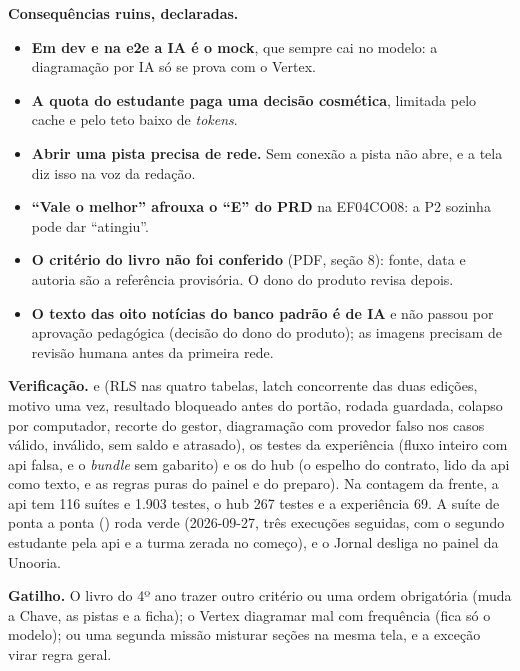 \textbf{Consequências ruins, declaradas.}

\begin{itemize}
  \item \textbf{Em dev e na e2e a IA é o mock}, que sempre cai no modelo: a
    diagramação por IA só se prova com o Vertex.
  \item \textbf{A quota do estudante paga uma decisão cosmética}, limitada pelo
    cache e pelo teto baixo de \emph{tokens}.
  \item \textbf{Abrir uma pista precisa de rede.} Sem conexão a pista não abre, e a
    tela diz isso na voz da redação.
  \item \textbf{\enquote{Vale o melhor} afrouxa o \enquote{E} do PRD} na EF04CO08: a
    P2 sozinha pode dar \enquote{atingiu}.
  \item \textbf{O critério do livro não foi conferido} (PDF, seção 8): fonte, data e
    autoria são a referência provisória. O dono do produto revisa depois.
  \item \textbf{O texto das oito notícias do banco padrão é de IA} e não passou por
    aprovação pedagógica (decisão do dono do produto); as imagens precisam de
    revisão humana antes da primeira rede.
\end{itemize}

\textbf{Verificação.}  e
 (RLS nas quatro tabelas, latch concorrente das
duas edições, motivo uma vez, resultado bloqueado antes do portão, rodada guardada,
colapso por computador, recorte do gestor, diagramação com provedor falso nos casos
válido, inválido, sem saldo e atrasado), os testes da experiência (fluxo inteiro
com api falsa, e o \emph{bundle} sem gabarito) e os do hub (o espelho do
contrato, lido da api como texto, e as regras puras do painel e do preparo). Na
contagem da frente, a api tem 116 suítes e 1.903 testes, o hub 267 testes e a
experiência 69. A suíte de ponta a ponta
() roda verde
(2026-09-27, três execuções seguidas, com o segundo estudante pela api e a turma
zerada no começo), e o Jornal desliga no painel da Unooria.

\textbf{Gatilho.} O livro do 4º ano trazer outro critério ou uma ordem obrigatória
(muda a Chave, as pistas e a ficha); o Vertex diagramar mal com frequência (fica só
o modelo); ou uma segunda missão misturar seções na mesma tela, e a exceção virar
regra geral.

